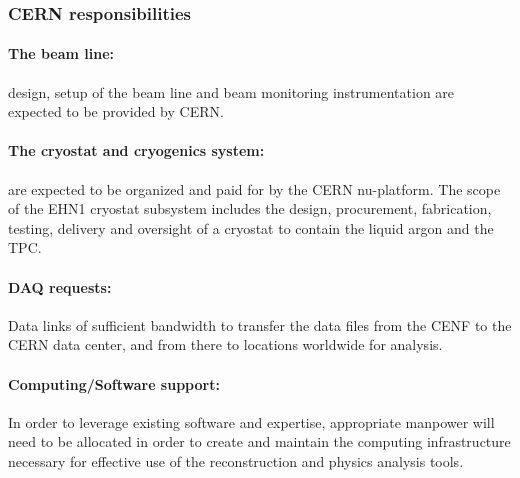 \subsubsection{CERN responsibilities}

\paragraph{The beam line:} design, setup of the beam line and beam monitoring instrumentation are expected to be provided by CERN.

\paragraph{The cryostat and cryogenics system:} are expected to be organized and paid for by the CERN nu-platform.
The scope of the EHN1 cryostat subsystem includes the design, procurement, fabrication, testing, delivery and oversight of a cryostat to contain the liquid argon and the TPC.\\

\paragraph{DAQ requests:}  Data links of sufficient bandwidth to transfer the data files from the CENF to the CERN data center, and from there to locations worldwide for analysis. \\

\paragraph{Computing/Software support:} In order to leverage existing software and expertise, appropriate manpower will need to be allocated in order to create and maintain the computing infrastructure necessary for effective use of the reconstruction and physics analysis tools.\\



